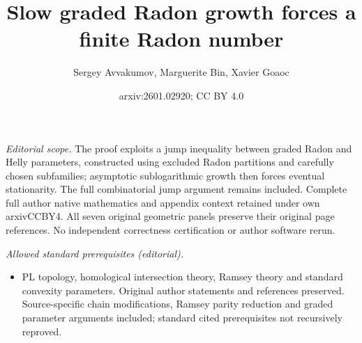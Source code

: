 \documentclass[11pt]{article}
\title{Slow graded Radon growth forces a finite Radon number}
\author{Sergey Avvakumov, Marguerite Bin, Xavier Goaoc}
\date{arxiv:2601.02920; CC BY 4.0}
\begin{document}
\maketitle
\noindent\textit{Editorial scope.} The proof exploits a jump inequality between graded Radon and Helly parameters, constructed using excluded Radon partitions and carefully chosen subfamilies; asymptotic sublogarithmic growth then forces eventual stationarity. The full combinatorial jump argument remains included. Complete full author native mathematics and appendix context retained under own arxivCCBY4. All seven original geometric panels preserve their original page references. No independent correctness certification or author software rerun.\par\medskip
\noindent\textit{Allowed standard prerequisites (editorial).}\begin{itemize}
\item PL topology, homological intersection theory, Ramsey theory and standard convexity parameters. Original author statements and references preserved. Source-specific chain modifications, Ramsey parity reduction and graded parameter arguments included; standard cited prerequisites not recursively reproved.
\end{itemize}\medskip
\end{document}
